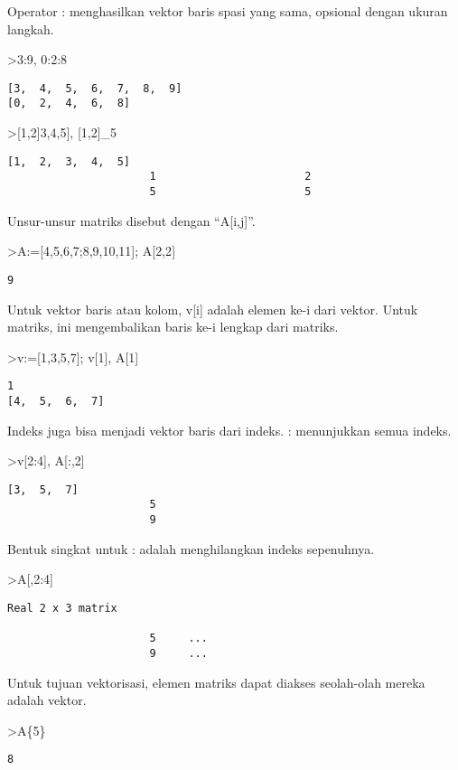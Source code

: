 \documentclass[
]{book}
\begin{document}
Operator : menghasilkan vektor baris spasi yang sama, opsional dengan ukuran langkah.

\textgreater3:9, 0:2:8

\begin{verbatim}
[3,  4,  5,  6,  7,  8,  9]
[0,  2,  4,  6,  8]
\end{verbatim}

\textgreater{[}1,2{]}\textbar{[}3,4,5{]}, {[}1,2{]}\_5

\begin{verbatim}
[1,  2,  3,  4,  5]
                      1                       2 
                      5                       5 
\end{verbatim}

Unsur-unsur matriks disebut dengan ``A{[}i,j{]}''.

\textgreater A:={[}4,5,6,7;8,9,10,11{]}; A{[}2,2{]}

\begin{verbatim}
9
\end{verbatim}

Untuk vektor baris atau kolom, v{[}i{]} adalah elemen ke-i dari vektor. Untuk matriks, ini mengembalikan baris ke-i lengkap dari matriks.

\textgreater v:={[}1,3,5,7{]}; v{[}1{]}, A{[}1{]}

\begin{verbatim}
1
[4,  5,  6,  7]
\end{verbatim}

Indeks juga bisa menjadi vektor baris dari indeks. : menunjukkan semua indeks.

\textgreater v{[}2:4{]}, A{[}:,2{]}

\begin{verbatim}
[3,  5,  7]
                      5 
                      9 
\end{verbatim}

Bentuk singkat untuk : adalah menghilangkan indeks sepenuhnya.

\textgreater A{[},2:4{]}

\begin{verbatim}
Real 2 x 3 matrix

                      5     ...
                      9     ...
\end{verbatim}

Untuk tujuan vektorisasi, elemen matriks dapat diakses seolah-olah mereka adalah vektor.

\textgreater A\{5\}

\begin{verbatim}
8
\end{verbatim}
\end{document}
